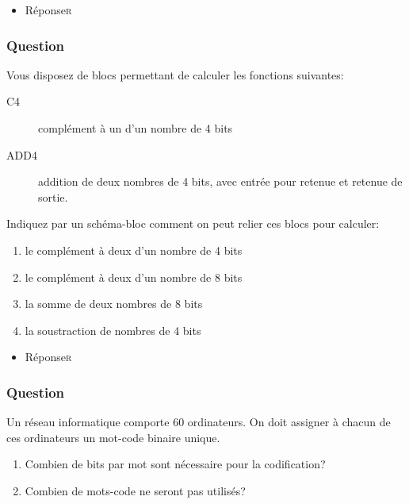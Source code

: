 \documentclass[11pt]{article}
\begin{document}
\begin{itemize}
\item Réponse\hfill{}\textsc{r}
\label{sec:org226ba3a}
\end{itemize}

\subsubsection*{Question}
\label{sec:orge60528d}
Vous disposez de blocs permettant de calculer les fonctions
   suivantes:

\begin{description}
\item[{C4}] complément à un d'un nombre de 4 bits

\item[{ADD4}] addition de deux nombres de 4 bits, avec entrée pour retenue et
retenue de sortie.
\end{description}

Indiquez par un schéma-bloc comment on peut relier ces blocs pour
calculer:

\begin{enumerate}
\item le complément à deux d'un nombre de 4 bits

\item le complément à deux d'un nombre de 8 bits

\item la somme de deux nombres de 8 bits

\item la soustraction de nombres de 4 bits
\end{enumerate}

\begin{itemize}
\item Réponse\hfill{}\textsc{r}
\label{sec:org44e4a7d}
\end{itemize}

\subsubsection*{Question}
\label{sec:org8d2b099}
Un réseau informatique comporte 60 ordinateurs. On doit assigner à
   chacun de ces ordinateurs un mot-code binaire unique.

\begin{enumerate}
\item Combien de bits par mot sont nécessaire pour la codification?

\item Combien de mots-code ne seront pas utilisés?
\end{enumerate}
\end{document}
